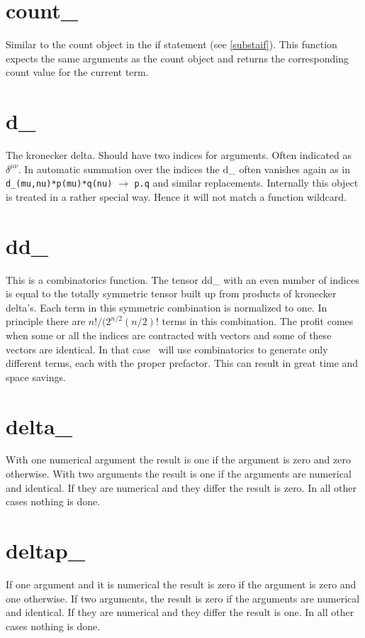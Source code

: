 \section{count\_}
\label{funcount}
\noindent Similar to the count object in the if statement (see 
\ref{substaif}). This function expects the same arguments as the count 
object and returns the corresponding count value for the current term.

\section{d\_}
\label{fund}
\noindent The kronecker delta. 
Should have two indices for arguments. Often indicated as 
$\delta^{\mu\nu}$. In automatic summation over the indices the d\_ often 
vanishes again as in
\verb:d_(mu,nu)*p(mu)*q(nu): $\rightarrow$ \verb:p.q: and similar 
replacements. Internally this object is treated in a rather special way. 
Hence it will not match a function wildcard.

\section{dd\_}
\label{fundd}
\noindent This is a combinatorics function. The tensor 
dd\_ with an even number of indices is equal to the totally symmetric 
tensor built up from products of kronecker delta's. Each term in this 
symmetric combination is normalized to one. In principle there are 
$n!/(2^{n/2}(n/2)!$ terms in this combination. The profit comes when some 
or all the indices are contracted with vectors and some of these vectors 
are identical. In that case \FORM\ will use combinatorics to generate only 
different terms, each with the proper prefactor. This can result in great 
time and space savings.

\section{delta\_}
\label{fundelta}
\noindent With one numerical argument the result is one if 
the argument is zero and zero otherwise. With two arguments the result is 
one if the arguments are numerical and identical. If they are numerical and 
they differ the result is zero. In all other cases nothing is done.

\section{deltap\_}
\label{fundeltap}
\noindent If one argument and it is numerical the result is zero if 
the argument is zero and one otherwise. If two arguments, the result is 
zero if the arguments are numerical and identical. If they are numerical and 
they differ the result is one. In all other cases nothing is done.


